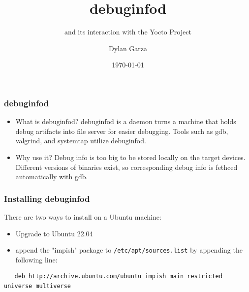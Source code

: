 \documentclass[12pt]{beamer}
\title{debuginfod}
\subtitle{and its interaction with the 
Yocto Project}
\author{Dylan Garza}
\date{\today}
\begin{document}
\frame{\titlepage}

\begin{frame}
   \frametitle{ debuginfod}
   \begin{itemize}
      \item What is debuginfod?
      debuginfod is a daemon turns a machine that
      holds debug artifacts into file server for
      easier debugging. Tools such as gdb, valgrind, and systemtap utilize 
         debuginfod. \\
      \vspace{.5cm}
      \item Why use it?
      Debug info is too big to be stored locally
      on the target devices. Different versions 
      of binaries exist, so corresponding debug info is fethced automatically 
      with gdb. 
   \end{itemize}
\end{frame}

\begin{frame}[fragile]
   \frametitle{ Installing debuginfod}
   \vspace{-1cm}
   \noindent
   There are two ways to install on a Ubuntu machine:
   \begin{itemize}
      \item Upgrade to Ubuntu 22.04
      \item append the "impish" package to \color{gray}\verb|/etc/apt/sources.list|
         \color{black} by appending the following line:
   \end{itemize}
   \color{gray}
   \fontsize{8pt}{10pt}{\selectfont}
   \begin{verbatim}
   deb http://archive.ubuntu.com/ubuntu impish main restricted universe multiverse
   \end{verbatim}
\end{frame}
\end{document}
